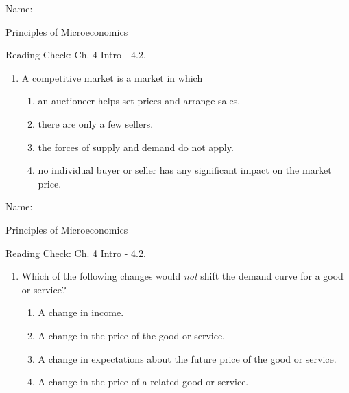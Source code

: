 \documentclass{article}
\begin{document}
Name: \underline{\phantom{xxxxxxxxxxxxxxxxxxxxxxxxxxxxxxxxxxxxxxxx}}

Principles of Microeconomics

Reading Check: Ch. 4 Intro - 4.2.

\begin{enumerate}

\item A competitive market is a market in which

	\begin{enumerate}
	
	\item an auctioneer helps set prices and arrange sales.
	
	\item there are only a few sellers.
	
	\item the forces of supply and demand do not apply.
	
	\item no individual buyer or seller has any significant impact on the market price.
	
	\end{enumerate}
	
\end{enumerate}

\bigskip

Name: \underline{\phantom{xxxxxxxxxxxxxxxxxxxxxxxxxxxxxxxxxxxxxxxx}}

Principles of Microeconomics

Reading Check: Ch. 4 Intro - 4.2.

\begin{enumerate}

\item Which of the following changes would \textit{not} shift the demand curve for a good or service?

	\begin{enumerate}
	
	\item A change in income.
	
	\item A change in the price of the good or service.
	
	\item A change in expectations about the future price of the good or service.

	\item A change in the price of a related good or service.
	
	\end{enumerate}
	
\end{enumerate}
\end{document}
